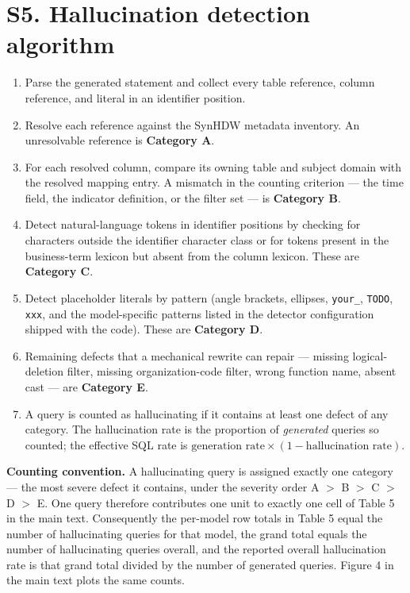 \documentclass[10pt]{article}
\begin{document}
\section{S5. Hallucination detection algorithm}
\begin{enumerate}[leftmargin=1.6em,itemsep=1pt,topsep=2pt]
  \item Parse the generated statement and collect every table reference, column
        reference, and literal in an identifier position.
  \item Resolve each reference against the SynHDW metadata inventory. An
        unresolvable reference is \textbf{Category A}.
  \item For each resolved column, compare its owning table and subject domain
        with the resolved mapping entry. A mismatch in the counting criterion
        --- the time field, the indicator definition, or the filter set --- is
        \textbf{Category B}.
  \item Detect natural-language tokens in identifier positions by checking for
        characters outside the identifier character class or for tokens present
        in the business-term lexicon but absent from the column lexicon. These
        are \textbf{Category C}.
  \item Detect placeholder literals by pattern (angle brackets, ellipses,
        \verb|your_|, \verb|TODO|, \verb|xxx|, and the model-specific patterns
        listed in the detector configuration shipped with the code). These are
        \textbf{Category D}.
  \item Remaining defects that a mechanical rewrite can repair --- missing
        logical-deletion filter, missing organization-code filter, wrong
        function name, absent cast --- are \textbf{Category E}.
  \item A query is counted as hallucinating if it contains at least one defect
        of any category. The hallucination rate is the proportion of
        \emph{generated} queries so counted; the effective SQL rate is
        $\text{generation rate}\times(1-\text{hallucination rate})$.
\end{enumerate}

\noindent
\textbf{Counting convention.} A hallucinating query is assigned exactly one
category --- the most severe defect it contains, under the severity order
A $>$ B $>$ C $>$ D $>$ E. One query therefore contributes one unit to exactly one
cell of Table 5 in the main text. Consequently the per-model row totals in
Table 5 equal the number of hallucinating queries for that model, the grand
total equals the number of hallucinating queries overall, and the reported
overall hallucination rate is that grand total divided by the number of
generated queries. Figure 4 in the main text plots the same counts.
\end{document}
